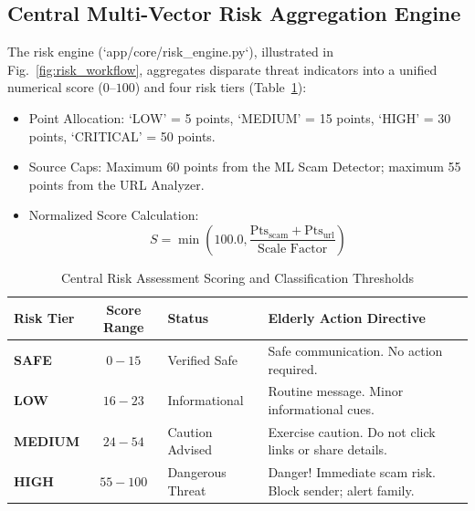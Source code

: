 \documentclass[conference]{IEEEtran}
\begin{document}
\subsection{Central Multi-Vector Risk Aggregation Engine}
The risk engine (`app/core/risk_engine.py`), illustrated in Fig.~\ref{fig:risk_workflow}, aggregates disparate threat indicators into a unified numerical score ($0$--$100$) and four risk tiers (Table~\ref{tab:risk_categories}):
\begin{itemize}
    \item Point Allocation: `LOW' = 5 points, `MEDIUM' = 15 points, `HIGH' = 30 points, `CRITICAL' = 50 points.
    \item Source Caps: Maximum 60 points from the ML Scam Detector; maximum 55 points from the URL Analyzer.
    \item Normalized Score Calculation:
    \begin{equation}
        S = \min\left(100.0, \frac{\text{Pts}_{\text{scam}} + \text{Pts}_{\text{url}}}{\text{Scale Factor}}\right)
    \end{equation}
\end{itemize}

\begin{table}[!t]
\centering
\caption{Central Risk Assessment Scoring and Classification Thresholds}
\label{tab:risk_categories}
\begin{tabular}{|l|c|l|p{3.2cm}|}
\hline
\textbf{Risk Tier} & \textbf{Score Range} & \textbf{Status} & \textbf{Elderly Action Directive} \\
\hline
\textbf{SAFE} & $0 - 15$ & Verified Safe & Safe communication. No action required. \\
\hline
\textbf{LOW} & $16 - 23$ & Informational & Routine message. Minor informational cues. \\
\hline
\textbf{MEDIUM} & $24 - 54$ & Caution Advised & Exercise caution. Do not click links or share details. \\
\hline
\textbf{HIGH} & $55 - 100$ & Dangerous Threat & Danger! Immediate scam risk. Block sender; alert family. \\
\hline
\end{tabular}
\end{table}
\end{document}
